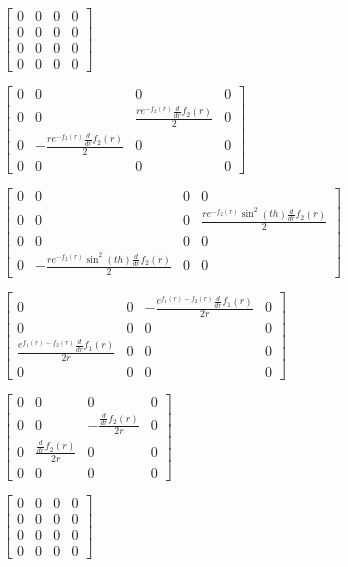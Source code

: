 \documentclass[11pt]{article}
\begin{document}
    
    $\displaystyle \left[\begin{matrix}0 & 0 & 0 & 0\\0 & 0 & 0 & 0\\0 & 0 & 0 & 0\\0 & 0 & 0 & 0\end{matrix}\right]$

    
    $\displaystyle \left[\begin{matrix}0 & 0 & 0 & 0\\0 & 0 & \frac{r e^{- f_{2}{\left(r \right)}} \frac{d}{d r} f_{2}{\left(r \right)}}{2} & 0\\0 & - \frac{r e^{- f_{2}{\left(r \right)}} \frac{d}{d r} f_{2}{\left(r \right)}}{2} & 0 & 0\\0 & 0 & 0 & 0\end{matrix}\right]$

    
    $\displaystyle \left[\begin{matrix}0 & 0 & 0 & 0\\0 & 0 & 0 & \frac{r e^{- f_{2}{\left(r \right)}} \sin^{2}{\left(th \right)} \frac{d}{d r} f_{2}{\left(r \right)}}{2}\\0 & 0 & 0 & 0\\0 & - \frac{r e^{- f_{2}{\left(r \right)}} \sin^{2}{\left(th \right)} \frac{d}{d r} f_{2}{\left(r \right)}}{2} & 0 & 0\end{matrix}\right]$

    
    $\displaystyle \left[\begin{matrix}0 & 0 & - \frac{e^{f_{1}{\left(r \right)} - f_{2}{\left(r \right)}} \frac{d}{d r} f_{1}{\left(r \right)}}{2 r} & 0\\0 & 0 & 0 & 0\\\frac{e^{f_{1}{\left(r \right)} - f_{2}{\left(r \right)}} \frac{d}{d r} f_{1}{\left(r \right)}}{2 r} & 0 & 0 & 0\\0 & 0 & 0 & 0\end{matrix}\right]$

    
    $\displaystyle \left[\begin{matrix}0 & 0 & 0 & 0\\0 & 0 & - \frac{\frac{d}{d r} f_{2}{\left(r \right)}}{2 r} & 0\\0 & \frac{\frac{d}{d r} f_{2}{\left(r \right)}}{2 r} & 0 & 0\\0 & 0 & 0 & 0\end{matrix}\right]$

    
    $\displaystyle \left[\begin{matrix}0 & 0 & 0 & 0\\0 & 0 & 0 & 0\\0 & 0 & 0 & 0\\0 & 0 & 0 & 0\end{matrix}\right]$
\end{document}
